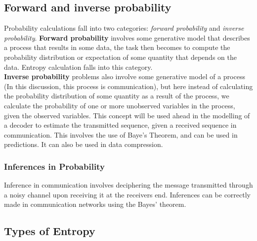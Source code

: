 \documentclass[10pt,twocolumn,letterpaper]{article}
\begin{document}
\subsection{Forward and inverse probability}
Probability calculations fall into two categories: \textit{forward probability} and \textit{inverse probability}.
\textbf{Forward probability} involves some generative model that describes a process that results in some data, the task then becomes to compute the probability distribution or expectation of some quantity that depends on the data. Entropy calculation falls into this category.\\
\textbf{Inverse probability} problems also involve some generative model of a process (In this discussion, this process is communication), but here instead of calculating the probability distribution of some quantity as a result of the process, we calculate the probability of one or more unobserved variables in the process, given the observed variables. This concept will be used ahead in the modelling of a decoder to estimate the transmitted sequence, given a received sequence in communication. This involves the use of Baye's Theorem, and can be used in predictions. It can also be used in data compression.
\subsubsection{Inferences in Probability}
Inference in communication involves deciphering the message transmitted through a noisy channel upon receiving it at the receivers end. Inferences can be correctly made in communication networks using the Bayes' theorem.

\subsection{Types of Entropy}
\end{document}
